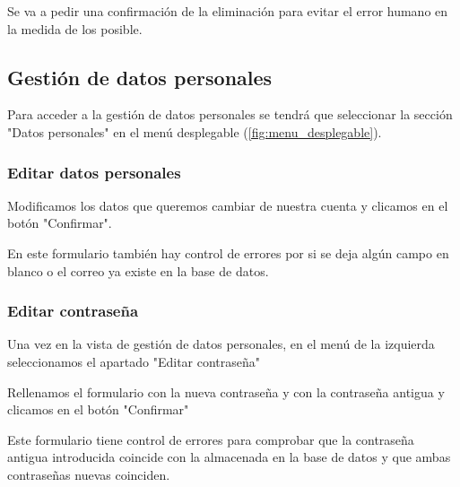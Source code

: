 
Se va a pedir una confirmación de la eliminación para evitar el error humano en la medida de los posible.


\subsection{Gestión de datos personales}

Para acceder a la gestión de datos personales se tendrá que seleccionar la sección "Datos personales"{} en el menú desplegable (\ref{fig:menu_desplegable}).


\subsubsection{Editar datos personales}

Modificamos los datos que queremos cambiar de nuestra cuenta y clicamos en el botón "{}Confirmar". 


En este formulario también hay control de errores por si se deja algún campo en blanco o el correo ya existe en la base de datos.

\subsubsection{Editar contraseña}

Una vez en la vista de gestión de datos personales, en el menú de la izquierda seleccionamos el apartado "{}Editar contraseña"


Rellenamos el formulario con la nueva contraseña y con la contraseña antigua y clicamos en el botón "{}Confirmar" 


Este formulario tiene control de errores para comprobar que la contraseña antigua introducida coincide con la almacenada en la base de datos y que ambas contraseñas nuevas coinciden. 

